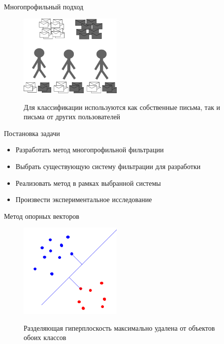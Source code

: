 \documentclass{beamer}
\begin{document}
\begin{frame}{Многопрофильный подход}
\begin{figure}[h]
\begin{center}
    \includegraphics[width=5cm]{img/multiprofile}
\end{center}
    Для классификации используются как собственные письма, так и письма от других пользователей
\end{figure}
\end{frame}
\begin{frame}{Постановка задачи}
\begin{itemize}
    \item Разработать метод многопрофильной фильтрации
    \item Выбрать существующую систему фильтрации для разработки
    \item Реализовать метод в рамках выбранной системы
    \item Произвести экспериментальное исследование
\end{itemize}
\end{frame}

\begin{frame}{Метод опорных векторов}
\begin{figure}[h]
\begin{center}
    \includegraphics[width=5cm]{../img/svm}
\end{center}
    Разделяющая гиперплоскость максимально удалена от объектов обоих классов
\end{figure}
\end{frame}
\end{document}
